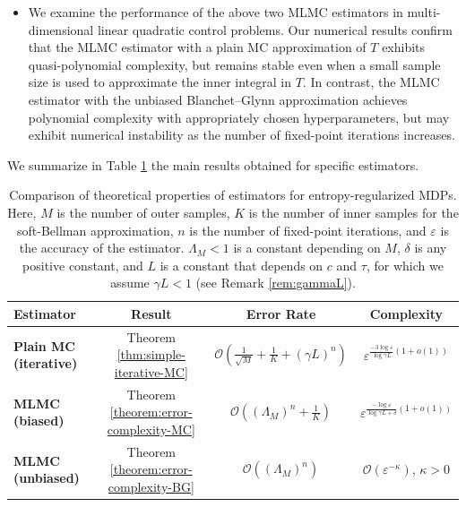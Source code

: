 \documentclass[11pt]{article}
\numberwithin{equation}{section}
\theoremstyle{definition}
\theoremstyle{remark}
\begin{document}
\begin{itemize}
   \item 

   We examine the performance of the above two MLMC estimators in multi-dimensional linear quadratic control problems.
Our numerical results confirm that the MLMC estimator with a plain MC approximation of 
$T$
exhibits quasi-polynomial complexity, but remains stable even when a small sample size is used to approximate the inner integral in $T$.  In contrast, the MLMC estimator with the unbiased Blanchet--Glynn approximation achieves polynomial complexity with appropriately chosen hyperparameters, but may exhibit numerical instability as the number of fixed-point iterations increases.
\end{itemize}

We summarize in Table \ref{tab:theoretical_summary} the main results obtained for specific estimators.
 \begin{table}[htbp]
\centering
\renewcommand{\arraystretch}{1.3}
\begin{tabular}{|l|c|c|c|}%
\hline
\textbf{Estimator} 
& \textbf{Result}
& \textbf{Error Rate} & \textbf{Complexity}  \\ %
\hline
\textbf{Plain MC (iterative)}
&
Theorem \ref{thm:simple-iterative-MC} 
& 
$\mathcal{O}\left(\frac{1}{\sqrt{M}} + \frac{1}{K} + (\gamma L)^n\right)$ &
$\varepsilon^{ \frac{-3 \log \varepsilon}{\log \gamma L}(1 + o(1))}$ 

\\
\hline
\textbf{MLMC  (biased)} & 
Theorem \ref{theorem:error-complexity-MC}
&
$\mathcal{O}\left((\Lambda_M)^n + \frac{1}{K}\right)$ &
$\varepsilon^{\frac{- \log \varepsilon}{\log \gamma L + \delta}(1 + o(1))}$
\\
\hline
\textbf{MLMC  (unbiased)} & 
Theorem \ref{theorem:error-complexity-BG}
&
$\mathcal{O}\left((\Lambda_M)^n\right)$ &
$\mathcal{O}\left(\varepsilon^{-\kappa}\right)$, $\kappa > 0$ 
\\
\hline
\end{tabular}
\caption{Comparison of theoretical properties of estimators
for entropy-regularized MDPs. Here, $M$ is the number of outer samples, $K$ is the number of inner samples for the soft-Bellman approximation,   $n$ is the number of fixed-point iterations,
and $\varepsilon$ is the   accuracy of the estimator. $\Lambda_M < 1$ is a constant depending on $M$, 
$\delta$ is any positive constant, 
and $L$ is a constant that depends on $c$ and $\tau$, for which we assume   $\gamma L < 1$ (see Remark \ref{rem:gammaL}).}
\label{tab:theoretical_summary}
\end{table}
 
\end{document}
